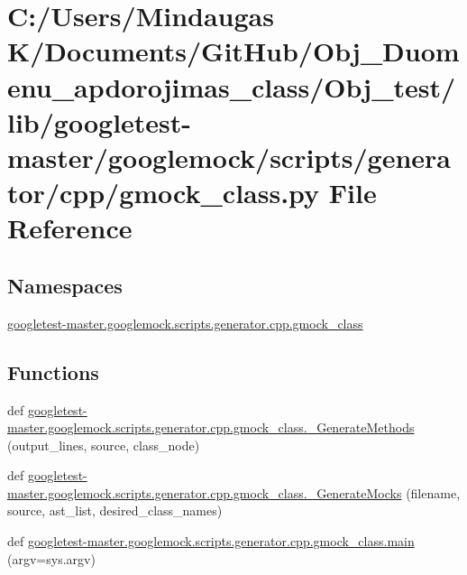 \hypertarget{_obj__test_2lib_2googletest-master_2googlemock_2scripts_2generator_2cpp_2gmock__class_8py}{}\section{C\+:/\+Users/\+Mindaugas K/\+Documents/\+Git\+Hub/\+Obj\+\_\+\+Duomenu\+\_\+apdorojimas\+\_\+class/\+Obj\+\_\+test/lib/googletest-\/master/googlemock/scripts/generator/cpp/gmock\+\_\+class.py File Reference}
\label{_obj__test_2lib_2googletest-master_2googlemock_2scripts_2generator_2cpp_2gmock__class_8py}
\subsection*{Namespaces}
\begin{DoxyCompactItemize}
\item 
 \mbox{\hyperlink{namespacegoogletest-master_1_1googlemock_1_1scripts_1_1generator_1_1cpp_1_1gmock__class}{googletest-\/master.\+googlemock.\+scripts.\+generator.\+cpp.\+gmock\+\_\+class}}
\end{DoxyCompactItemize}
\subsection*{Functions}
\begin{DoxyCompactItemize}
\item 
def \mbox{\hyperlink{namespacegoogletest-master_1_1googlemock_1_1scripts_1_1generator_1_1cpp_1_1gmock__class_ab82be69c6bd483ffdd04d11f6bb66256}{googletest-\/master.\+googlemock.\+scripts.\+generator.\+cpp.\+gmock\+\_\+class.\+\_\+\+Generate\+Methods}} (output\+\_\+lines, source, class\+\_\+node)
\item 
def \mbox{\hyperlink{namespacegoogletest-master_1_1googlemock_1_1scripts_1_1generator_1_1cpp_1_1gmock__class_ac9e5319db0f78f43d8dab068e8ac6c42}{googletest-\/master.\+googlemock.\+scripts.\+generator.\+cpp.\+gmock\+\_\+class.\+\_\+\+Generate\+Mocks}} (filename, source, ast\+\_\+list, desired\+\_\+class\+\_\+names)
\item 
def \mbox{\hyperlink{namespacegoogletest-master_1_1googlemock_1_1scripts_1_1generator_1_1cpp_1_1gmock__class_acf709d6f879e39af13ddebafc93b36e2}{googletest-\/master.\+googlemock.\+scripts.\+generator.\+cpp.\+gmock\+\_\+class.\+main}} (argv=sys.\+argv)
\end{DoxyCompactItemize}
